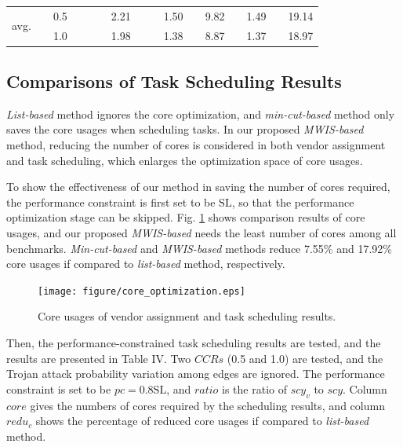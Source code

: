 \documentclass[10pt,journal]{IEEEtran}
\begin{document}
\begin{table}[!t]
\begin{tabular}{c|c|c|c|c|c|c|c|c|c|c|c|c|c|c|c}
\hline
\multicolumn{1}{c|}{\multirow{2}{*}{avg.}}     & &0.5 &      &  &  &2.21     &  & &1.50 &   &9.82  &   &1.49  & &19.14 \\
                                               &  &1.0 &     &  &  &1.98     &  & &1.38 &   &8.87  &    &1.37  &  &18.97 \\

\hline
\hline
\end{tabular}
\label{table:PCTS}
\end{table}





\subsection{Comparisons of Task Scheduling Results}



\textit{List-based} method ignores the core optimization, and \textit{min-cut-based} method only saves the core usages when scheduling tasks. In our proposed \textit{MWIS-based} method, reducing the number of cores is considered in both vendor assignment and task scheduling, which enlarges the optimization space of core usages.

To show the effectiveness of our method in saving the number of cores required, the performance constraint is first set to be $\mathrm{SL}$, so that the performance optimization stage can be skipped. Fig. \ref{fig:core_optimization} shows comparison results of core usages, and our proposed \textit{MWIS-based} needs the least number of cores among all benchmarks. \textit{Min-cut-based} and \textit{MWIS-based} methods reduce 7.55\% and 17.92\% core usages if compared to \textit{list-based} method, respectively.%
\begin{figure}[!h]
\centering
\hspace*{-1.2em}
\texttt{[image: figure/core\_optimization.eps]}
\caption{Core usages of vendor assignment and task scheduling results.}
\label{fig:core_optimization}
\end{figure}

Then, the performance-constrained task scheduling results are tested, and the results are presented in Table IV. Two $CCRs$ (0.5 and 1.0) are tested, and the Trojan attack probability variation among edges are ignored. The performance constraint is set to be $pc=\mathrm{0.8SL}$, and $ratio$ is the ratio of $scy_v$ to $scy$. Column $core$ gives the numbers of cores required by the scheduling results, and column $redu_{c}$ shows the percentage of reduced core usages if compared to \textit{list-based} method.
\end{document}
